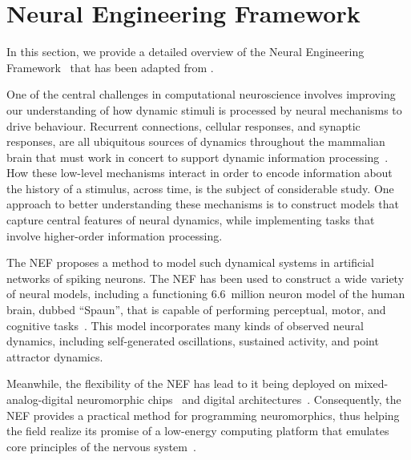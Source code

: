 
\section{Neural Engineering Framework}
\label{sec:nef}

In this section, we provide a detailed overview of the Neural Engineering Framework~\citep[NEF;][]{eliasmith2003a} that has been adapted from \citet{voelker2018}.

One of the central challenges in computational neuroscience involves improving our understanding of how dynamic stimuli is processed by neural mechanisms to drive behaviour.
Recurrent connections, cellular responses, and synaptic responses, are all ubiquitous sources of dynamics throughout the mammalian brain that must work in concert to support dynamic information processing~\citep{kandel2000principles}.
How these low-level mechanisms interact in order to encode information about the history of a stimulus, across time, is the subject of considerable study.
One approach to better understanding these mechanisms is to construct models that capture central features of neural dynamics, while implementing tasks that involve higher-order information processing.


The NEF proposes a method to model such dynamical systems in artificial networks of spiking neurons.
The NEF has been used to construct a wide variety of neural models, including a functioning 6.6~million neuron model of the human brain, dubbed ``Spaun'', that is capable of performing perceptual, motor, and cognitive tasks~\citep{eliasmith2012, choo2018}.
This model incorporates many kinds of observed neural dynamics, including self-generated oscillations, sustained activity, and point attractor dynamics.

Meanwhile, the flexibility of the NEF has lead to it being deployed on mixed-analog-digital neuromorphic chips~\citep{choudhary2012silicon, corradi2014, voelker2017iscas, voelker2017neuromorphic, braindrop2019} and digital architectures~\citep{bekolay2013, wang2014compact, mundy2015, knight2016, berzish2016, wang2017neuromorphic, blouw2018a}.
Consequently, the NEF provides a practical method for programming neuromorphics, thus helping the field realize its promise of a low-energy computing platform that emulates core principles of the nervous system~\citep{boahen2017neuromorph}.

